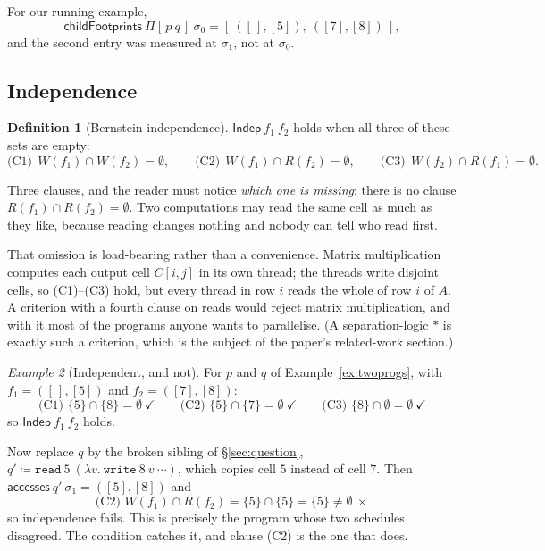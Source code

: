 \documentclass[11pt,a4paper]{article}
\theoremstyle{definition}
\newtheorem{definition}{Definition}
\theoremstyle{plain}
\theoremstyle{remark}
\newtheorem{example}[definition]{Example}
\newcommand{\st}{\sigma}
\newcommand{\reads}[1]{R(#1)}
\newcommand{\writes}[1]{W(#1)}
\newcommand{\acc}{\mathsf{accesses}}
\newcommand{\Indep}{\mathsf{Indep}}
\begin{document}
For our running example,
\[
  \mathsf{childFootprints}\ \Pi[\,p\ q\,]\ \st_0 = [\ ([\,],[5]),\ ([7],[8])\ ],
\]
and the second entry was measured at $\st_1$, not at $\st_0$.

\subsection{Independence}\label{sec:indep:indep}

\begin{definition}[Bernstein independence]\label{def:indep}
$\Indep\ f_1\ f_2$ holds when all three of these sets are empty:
\[
  \text{(C1)}\ \ \writes{f_1} \cap \writes{f_2} = \emptyset, \qquad
  \text{(C2)}\ \ \writes{f_1} \cap \reads{f_2} = \emptyset, \qquad
  \text{(C3)}\ \ \writes{f_2} \cap \reads{f_1} = \emptyset .
\]
\end{definition}

Three clauses, and the reader must notice \emph{which one is missing}: there is no clause
$\reads{f_1} \cap \reads{f_2} = \emptyset$. Two computations may read the same cell as much
as they like, because reading changes nothing and nobody can tell who read first.

That omission is load-bearing rather than a convenience. Matrix multiplication computes each
output cell $C[i,j]$ in its own thread; the threads write disjoint cells, so (C1)--(C3)
hold, but every thread in row $i$ reads the whole of row $i$ of $A$. A criterion with a
fourth clause on reads would reject matrix multiplication, and with it most of the programs
anyone wants to parallelise. (A separation-logic $\ast$ is exactly such a criterion, which
is the subject of the paper's related-work section.)

\begin{example}[Independent, and not]\label{ex:indep}
For $p$ and $q$ of Example~\ref{ex:twoprogs}, with $f_1 = ([\,],[5])$ and $f_2 = ([7],[8])$:
\[
  \text{(C1) } \{5\} \cap \{8\} = \emptyset \ \checkmark \qquad
  \text{(C2) } \{5\} \cap \{7\} = \emptyset \ \checkmark \qquad
  \text{(C3) } \{8\} \cap \emptyset = \emptyset \ \checkmark
\]
so $\Indep\ f_1\ f_2$ holds.

Now replace $q$ by the broken sibling of \S\ref{sec:question},
$q' \coloneqq \texttt{read}\ 5\ (\lambda v.\ \texttt{write}\ 8\ v\ \cdots)$, which copies
cell $5$ instead of cell $7$. Then $\acc\ q'\ \st_1 = ([5],[8])$ and
\[
  \text{(C2) } \writes{f_1} \cap \reads{f_2} = \{5\} \cap \{5\} = \{5\} \neq \emptyset \ \times
\]
so independence fails. This is precisely the program whose two schedules disagreed. The
condition catches it, and clause (C2) is the one that does.
\end{example}
\end{document}
